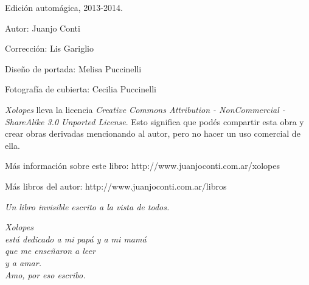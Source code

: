 \documentclass[12pt,twoside,openright,a5paper]{book}
\begin{document}

\pagestyle{plain}



\cleardoublepage

\thispagestyle{empty}
\noindent
Edición automágica, 2013-2014.\\

\vspace{0.5cm}

\noindent
Autor: Juanjo Conti

\noindent
Corrección: Lis Gariglio

\noindent
Diseño de portada: Melisa Puccinelli

\noindent
Fotografía de cubierta: Cecilia Puccinelli

\vspace{1cm}

\noindent
\emph{Xolopes} lleva la licencia 
\emph{Creative Commons Attribution - NonCommercial - ShareAlike 3.0 Unported License}.
Esto significa que podés compartir esta obra y crear obras derivadas
mencionando al autor, pero no ha\-cer un uso comercial de ella.

\vfill

\noindent
Más información sobre este libro: http://www.juanjoconti.com.ar/xolopes

\vspace{0.5cm}
\noindent
Más libros del autor: http://www.juanjoconti.com.ar/libros

\cleardoublepage


\begin{center}
\vspace*{\fill}
\emph{Un libro invisible escrito a la vista de todos.}
\vspace*{\fill}
\end{center}

\cleardoublepage

\noindent
\begin{flushright}
\emph{
\emph{Xolopes} \\está dedicado a mi papá y a mi mamá\\
que me enseñaron a leer \\y a amar.\\
\vspace{0.5cm}
Amo, por eso escribo.
}

\end{flushright}

\cleardoublepage
\end{document}
